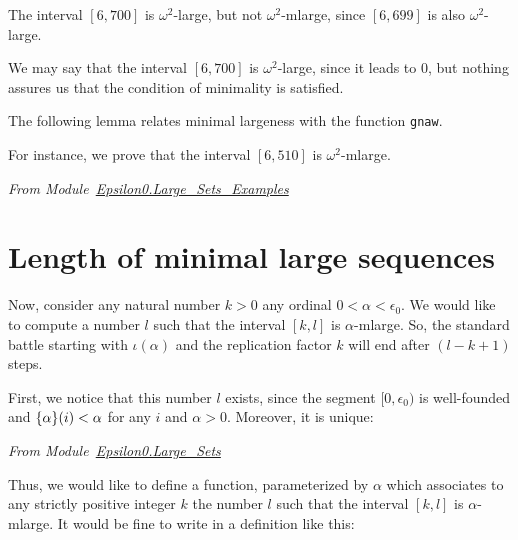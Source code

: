 

The interval $[6,700]$ is $\omega^2$-large, but not
$\omega^2$-mlarge, since $[6,699]$ is also $\omega^2$-large.






We may say that the interval $[6,700]$ is $\omega^2$-large, since it leads to $0$, but nothing assures us that the condition of minimality is satisfied.

The following lemma relates minimal largeness with the
function 
\texttt{gnaw}. 





For instance, we prove that the interval $[6,510]$ is $\omega^2$-mlarge.

\vspace{4pt}
 \noindent
\emph{From Module~\href{../theories/html/hydras.Epsilon0.Large_Sets_Examples.html}{Epsilon0.Large\_Sets\_Examples}}



\section{Length of minimal large sequences}

Now, consider any natural number $k>0$ any ordinal $0<\alpha<\epsilon_0$.  We would like to compute
a number $l$ such that the interval $[k,l]$ is $\alpha$-mlarge. So, 
the standard battle starting with $\iota(\alpha)$ and the replication factor $k$ will end after $(l-k+1)$ steps.



First, we notice that this  number $l$ exists, since the segment $[0,\epsilon_0)$ is well-founded and $\mbox{$\{\alpha\}(i)$}<\alpha$ for any $i$ and $\alpha>0$.
Moreover, it is unique:

\vspace{4pt}
\noindent
\emph{From Module~\href{../theories/html/hydras.Epsilon0.Large_Sets.html}{Epsilon0.Large\_Sets}}




Thus, we would like to define a function, parameterized by $\alpha$ which associates to any  strictly positive integer $k$ the number $l$ such that
the interval $[k,l]$ is $\alpha$-mlarge. It would be fine to write in \gallina{} a definition like this:


